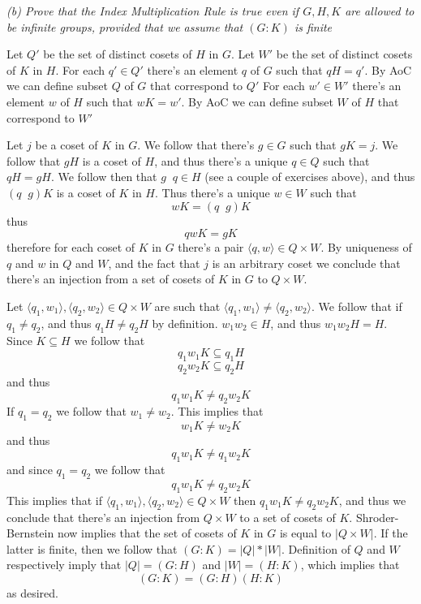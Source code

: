 \documentclass[11pt,oneside,titlepage]{book}
\DeclareMathOperator \inv {^{-1}}
\newcommand{\eangle}[1]{\langle #1 \rangle}
\begin{document}
\textit{(b) Prove that the Index Multiplication Rule is true even if
$G, H, K$ are allowed to be infinite groups, provided that we assume
that $(G:K)$ is finite}

Let $Q'$ be the set of distinct cosets of $H$ in $G$.  Let $W'$ be the
set of distinct cosets of $K$ in $H$.  For each $q' \in Q'$ there's an
element $q$ of $G$ such that $qH = q'$. By AoC we can define subset
$Q$ of $G$ that correspond to $Q'$ For each $w' \in W'$ there's an
element $w$ of $H$ such that $wK = w'$. By AoC we can define subset
$W$ of $H$ that correspond to $W'$

Let $j$ be a coset of $K$ in $G$. We follow that there's $g \in G$
such that $gK = j$. We follow that $gH$ is a coset of $H$, and thus
there's a unique $q \in Q$ such that $qH = gH$. We follow then that
$g\inv q \in H$ (see a couple of exercises above), and thus $(q\inv g)
K$ is a coset of $K$ in $H$. Thus there's a unique $w \in W$ such that
$$w K = (q\inv g ) K$$
thus
$$q w K = gK$$
therefore for each coset of $K$ in $G$ there's a pair $\eangle{q, w}
\in Q \times W$. By uniqueness of $q$ and $w$ in $Q$ and $W$, and the
fact that $j$ is an arbitrary coset we conclude that there's an
injection from a set of cosets of $K$ in $G$ to $Q \times W$.

Let $\eangle{q_1, w_1}, \eangle{q_2, w_2} \in Q \times W$ are such
that $\eangle{q_1, w_1} \neq \eangle{q_2, w_2}$. We follow that if
$q_1 \neq q_2$, and thus $q_1 H \neq q_2 H$ by definition.  $w_1 w_2
\in H$, and thus $w_1 w_2 H = H$. Since $K \subseteq H$ we follow that
$$q_1 w_1 K \subseteq q_1 H$$
$$q_2 w_2 K \subseteq q_2 H$$
and thus
$$q_1 w_1 K \neq q_2 w_2 K$$
If $q_1 = q_2$ we follow that $w_1 \neq w_2$. This implies that
$$w_1 K \neq w_2 K$$
and thus
$$q_1 w_1 K \neq q_1 w_2 K$$
and since $q_1 = q_2$ we follow that
$$q_1 w_1 K \neq q_2 w_2 K$$
This implies that if $\eangle{q_1, w_1}, \eangle{q_2, w_2} \in Q
\times W$ then $q_1 w_1 K \neq q_2 w_2 K$, and thus we conclude that
there's an injection from $Q \times W$ to a set of cosets of
$K$. Shroder-Bernstein now implies that the set of cosets of $K$ in
$G$ is equal to $|Q \times W|$. If the latter is finite, then we
follow that $(G:K) = |Q| * |W|$. Definition of $Q$ and $W$
respectively imply that $|Q| = (G:H)$ and $|W| = (H:K)$, which implies
that
$$(G:K) = (G:H) (H:K)$$
as desired.

\subsection{}
\end{document}
